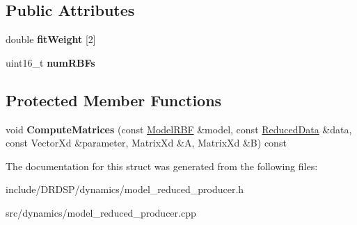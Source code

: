 \subsection*{Public Attributes}
\begin{DoxyCompactItemize}
\item 
\hypertarget{struct_d_r_d_s_p_1_1_model_reduced_producer_a4e9f5becf0b34a66d51e58c3ae01cc95}{double {\bfseries fit\-Weight} \mbox{[}2\mbox{]}}\label{struct_d_r_d_s_p_1_1_model_reduced_producer_a4e9f5becf0b34a66d51e58c3ae01cc95}

\item 
\hypertarget{struct_d_r_d_s_p_1_1_model_reduced_producer_aea6a94427883e4d4368ace49982cbd7e}{uint16\-\_\-t {\bfseries num\-R\-B\-Fs}}\label{struct_d_r_d_s_p_1_1_model_reduced_producer_aea6a94427883e4d4368ace49982cbd7e}

\end{DoxyCompactItemize}
\subsection*{Protected Member Functions}
\begin{DoxyCompactItemize}
\item 
\hypertarget{struct_d_r_d_s_p_1_1_model_reduced_producer_a14d6748b64822a8e1cbf9cb931d84f74}{void {\bfseries Compute\-Matrices} (const \hyperlink{struct_d_r_d_s_p_1_1_model_r_b_f}{Model\-R\-B\-F} \&model, const \hyperlink{struct_d_r_d_s_p_1_1_reduced_data}{Reduced\-Data} \&data, const Vector\-Xd \&parameter, Matrix\-Xd \&A, Matrix\-Xd \&B) const }\label{struct_d_r_d_s_p_1_1_model_reduced_producer_a14d6748b64822a8e1cbf9cb931d84f74}

\end{DoxyCompactItemize}


The documentation for this struct was generated from the following files\-:\begin{DoxyCompactItemize}
\item 
include/\-D\-R\-D\-S\-P/dynamics/model\-\_\-reduced\-\_\-producer.\-h\item 
src/dynamics/model\-\_\-reduced\-\_\-producer.\-cpp\end{DoxyCompactItemize}
